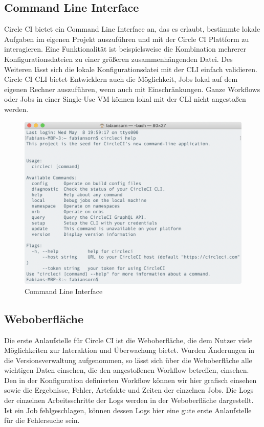 \documentclass[11pt]{article}
\begin{document}
\subsection{Command Line Interface}
Circle CI bietet ein Command Line Interface an, das es erlaubt, bestimmte lokale Aufgaben im eigenen Projekt auszuführen und mit der Circle CI Plattform zu interagieren. Eine Funktionalität ist beispielsweise die Kombination mehrerer Konfigurationsdateien zu einer größeren zusammenhängenden Datei. Des Weiteren lässt sich die lokale Konfigurationsdatei mit der CLI einfach validieren. Circle CI CLI bietet Entwicklern auch die Möglichkeit, Jobs lokal auf dem eigenen Rechner auszuführen, wenn auch mit Einschränkungen. Ganze Workflows oder Jobs in einer Single-Use VM können lokal mit der CLI nicht angestoßen werden.

\begin{figure}[H]
	\centering
  	\includegraphics[width=0.7\linewidth]{../Images/CLI}
  	\caption{Command Line Interface}
  	\label{fig:cli}
\end{figure}

\subsection{Weboberfläche}
Die erste Anlaufstelle für Circle CI ist die Weboberfläche, die dem Nutzer viele Möglichkeiten zur Interaktion und Überwachung bietet. Wurden Änderungen in die Versionsverwaltung aufgenommen, so lässt sich über die Weboberfläche alle wichtigen Daten einsehen, die den angestoßenen Workflow betreffen, einsehen. Den in der Konfiguration definierten Workflow können wir hier grafisch einsehen sowie die Ergebnisse, Fehler, Artefakte und Zeiten der einzelnen Jobs. Die Logs der einzelnen Arbeitsschritte der Logs werden in der Weboberfläche dargestellt. Ist ein Job fehlgeschlagen, können dessen Logs hier eine gute erste Anlaufstelle für die Fehlersuche sein.
\end{document}
